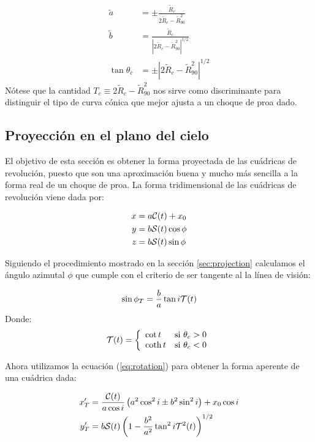 \begin{align}
  \tilde{a} &= \pm\frac{\tilde{R}_c}{2\tilde{R}_c - \tilde{R}_{90}^2} \label{eq:til-a}\\
  \tilde{b} &= \frac{\tilde{R}_c}{\left|2\tilde{R}_c - \tilde{R}_{90}^2\right|^{1/2}}\label{eq:til-b}\\
  \tan\theta_c &= \pm\left|2\tilde{R}_c - \tilde{R}_{90}^2\right|^{1/2} \label{eq:thc2}
\end{align}
Nótese que la cantidad $T_c\equiv 2\tilde{R}_c - \tilde{R}_{90}^2$ nos sirve como discriminante para
distinguir el tipo de curva cónica que mejor ajusta a un choque de proa dado.

\subsection{Proyección en el plano del cielo}

El objetivo de esta sección es obtener la forma proyectada de las cuádricas de revolución,
puesto que son una aproximación buena y mucho más sencilla a la forma real de un choque de
proa.
La forma tridimensional de las cuádricas de revolución viene dada por:

\begin{align}
  x &= a\mathcal{C}(t) + x_0 \\
  y &= b\mathcal{S}(t)\cos\phi \\
  z &= b\mathcal{S}(t)\sin\phi
\end{align}

Siguiendo el procedimiento mostrado en la sección \ref{sec:projection} calculamos el ángulo
azimutal $\phi$ que cumple con el criterio de ser tangente al la línea de visión:

\begin{align}
  \sin\phi_T = \frac{b}{a}\tan i\mathcal{T}(t) 
\end{align}
Donde:
\begin{align}
  \mathcal{T}(t) = \left\lbrace
  \begin{array}{lr}
    \cot t & \mathrm{si}~\theta_c > 0 \\
    \coth t & \mathrm{si}~\theta_c < 0 
  \end{array}
  \right.
\end{align}

Ahora utilizamos la ecuación (\ref{eq:rotation})
para obtener la forma aperente de una cuádrica dada:

\begin{align}
  x'_T &= \frac{\mathcal{C}(t)}{a\cos i}\left(a^2\cos^2 i \pm b^2\sin^2 i\right) + x_0\cos i
  \label{eq:x-prime-proj}\\
  y'_T &= b\mathcal{S}(t)\left(1 - \frac{b^2}{a^2}\tan^2 i\mathcal{T}^2(t)\right)^{1/2}
  \label{eq:y-prime-proj}
\end{align}

